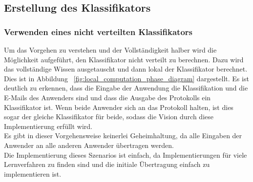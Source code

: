 \documentclass{article}
\theoremstyle{definition}
\theoremstyle{remark}
\begin{document}
\subsection{Erstellung des Klassifikators}
\subsubsection{Verwenden eines nicht verteilten Klassifikators}
Um das Vorgehen zu verstehen und der Vollst\"andigkeit halber wird die
M\"oglichkeit aufgef\"uhrt, den Klassifikator nicht verteilt
zu berechnen. Dazu wird das vollst\"andige Wissen ausgetauscht und 
dann lokal der Klassifikator berechnet. Dies ist in Abbildung 
~\ref{fig:local_computation_phase_diagram} dargestellt. Es ist deutlich
zu erkennen, dass die Eingabe der Anwendung die Klassifikation und die E-Mails
des Anwenders sind und dass die Ausgabe des Protokolls ein Klassifikator ist.
Wenn beide Anwender sich an das Protokoll halten, ist dies sogar der gleiche
Klassifikator f\"ur beide, sodass die Vision durch diese Implementierung
erf\"ullt wird.\\
Es gibt in dieser Vorgehensweise keinerlei Geheimhaltung, da alle Eingaben der 
Anwender an alle anderen Anwender \"ubertragen werden. \\
Die Implementierung dieses Szenarios ist einfach, da Implementierungen f\"ur
viele Lernverfahren zu finden sind und die initiale \"Ubertragung einfach
zu implementieren ist. 
\end{document}
